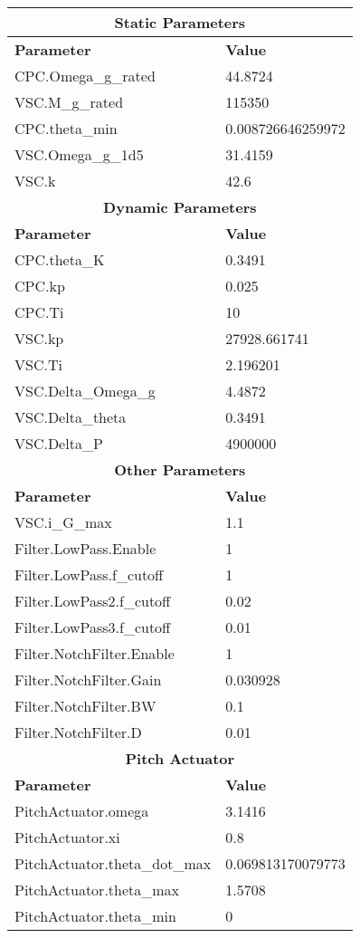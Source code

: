 \begin{longtable}{|l|l|}
	\hline
	\multicolumn{2}{|c|}{\textbf{Static Parameters}} \\ \hline
	\textbf{Parameter} & \textbf{Value} \\ \hline
	CPC.Omega\_g\_rated & 44.8724 \\
	VSC.M\_g\_rated & 115350 \\
	CPC.theta\_min & 0.008726646259972 \\
	VSC.Omega\_g\_1d5 & 31.4159 \\
	VSC.k & 42.6 \\\hline
	\multicolumn{2}{|c|}{\textbf{Dynamic Parameters}} \\ \hline
	\textbf{Parameter} & \textbf{Value} \\ \hline
	CPC.theta\_K & 0.3491 \\
	CPC.kp & 0.025 \\
	CPC.Ti & 10 \\
	VSC.kp & 27928.661741 \\
	VSC.Ti & 2.196201 \\
	VSC.Delta\_Omega\_g & 4.4872 \\
	VSC.Delta\_theta & 0.3491 \\
	VSC.Delta\_P & 4900000 \\\hline
	\multicolumn{2}{|c|}{\textbf{Other Parameters}} \\ \hline
	\textbf{Parameter} & \textbf{Value} \\ \hline
	VSC.i\_G\_max & 1.1 \\
	Filter.LowPass.Enable & 1 \\
	Filter.LowPass.f\_cutoff & 1 \\
	Filter.LowPass2.f\_cutoff & 0.02 \\
	Filter.LowPass3.f\_cutoff & 0.01 \\
	Filter.NotchFilter.Enable & 1 \\
	Filter.NotchFilter.Gain & 0.030928 \\
	Filter.NotchFilter.BW & 0.1 \\
	Filter.NotchFilter.D & 0.01 \\\hline
	\multicolumn{2}{|c|}{\textbf{Pitch Actuator}} \\ \hline
	\textbf{Parameter} & \textbf{Value} \\ \hline
	PitchActuator.omega & 3.1416 \\
	PitchActuator.xi & 0.8 \\
	PitchActuator.theta\_dot\_max & 0.069813170079773 \\
	PitchActuator.theta\_max & 1.5708 \\
	PitchActuator.theta\_min & 0 \\\hline
\end{longtable}
